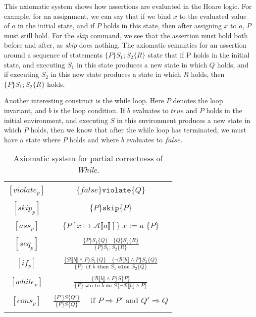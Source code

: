 This axiomatic system shows how assertions are evaluated in the Hoare logic.
For example, for an assignment, we can say that if we bind $x$ to the evaluated value of $a$ in the initial state, and if $P$ holds in this state, then after assigning $x$ to $a$, $P$ must still hold.
For the \textit{skip} command, we see that the assertion must hold both before and after, as \textit{skip} does nothing.
The axiomatic semantics for an assertion around a sequence of statements $\{P\} S_1;S_2\{R\}$ state that if P holds in the initial state, and executing $S_1$ in this state produces a new state in which $Q$ holds, and if executing $S_2$ in this new state produces a state in which $R$ holds, then $\{P\} S_1;S_2 \{R\}$ holds.

Another interesting construct is the while loop.
Here $P$ denotes the loop invariant, and $b$ is the loop condition.
If $b$ evaluates to $true$ and $P$ holds in the initial environment, and executing $S$ in this environment produces a new state in which $P$ holds, then we know that after the while loop has terminated, we must have a state where $P$ holds and where $b$ evaluates to $false$.

\begin{table}[h!]
\centering
\begin{tabular}{|c c|} 
 \hline
	& \\
 $[violate_p ]$ & $\{ false \} \texttt{violate} \{ Q \}$ \\ 
	& \\
 $[skip_p ]$ & $\{ P \} \texttt{skip} \{ P \}$ \\ 
	& \\
 $[ass_p ]$ & $\{ P[x \mapsto \mathcal{A} \llbracket a \rrbracket ] \} \; x := a \; \{ P \}$ \\ 
	& \\
 $[seq_p ]$ & 
		$\frac{\{ P \} S_1 \{Q \} \quad \{ Q\} S_2 \{ R \}}{\{ P \} S_1;S_2 \{ R \}}$ \\ 
	& \\
 $[if_p ]$ & 
		$\frac{ \{\mathcal{B} \llbracket b \rrbracket \land P \} S_1 \{ Q \} \quad 
           \{ \neg \mathcal{B} \llbracket b \rrbracket \land P\} S_2 \{ Q \} }
          {\{P\} \texttt{ if } b \texttt{ then } S_1 \texttt{ else } S_2 \{Q\}}$ \\
	& \\
 $[while_p ]$ & 
		$\frac{ \{\mathcal{B} \llbracket b \rrbracket \land P \} S \{ P \}}
          {\{P\} \texttt{ while } b \texttt{ do } S 
           \{\neg \mathcal{B} \llbracket b \rrbracket \land P\}}$ \\
	& \\
 $[cons_p ]$ & 
		$\frac{ \{P'\} S \{Q'\}}{\{P\} S \{Q\}} \quad 
     \text{ if } P \Rightarrow P' \text{ and } Q' \Rightarrow Q $ \\
	& \\
 \hline
\end{tabular}
\caption{Axiomatic system for partial correctness of \textit{While}\cite{nielson}.}
\label{table:axiomatic}
\end{table}

